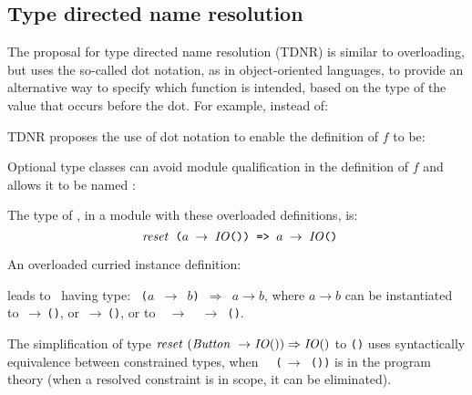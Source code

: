 \subsection{Type directed name resolution}
\label{sec:type-directed-name-resolution}

The proposal for type directed name resolution (TDNR)
\cite{TDNR-proposal} is similar to overloading, but uses the so-called
dot notation, as in object-oriented languages, to provide an
alternative way to specify which function is intended, based on the
type of the value that occurs before the dot. For example, instead of:


TDNR proposes the use of dot notation to enable the definition of $f$
to be: %


Optional type classes can avoid module qualification in the definition
of $f$ and allows it to be named \reset:
    

The type of \reset, in a module with these overloaded definitions, is:
\[ \texttt{ {\it reset\/}\ ($a$ $\rightarrow$ {\it IO\/}()) => $a$ $\rightarrow$ {\it IO\/}()} \]
  
An overloaded curried instance definition:

leads to \reset\ having type:
{\tt \reset\ ($a$ $\rightarrow$ $b$) $\Rightarrow$ $a \rightarrow b$}, where $a\rightarrow b$ can be
instantiated to {\tt \Button$\,\rightarrow\,$\IO()}, or {\tt \Canvas$\,\rightarrow\,$\IO()}, or
to {\tt $\,$\Button\ $\rightarrow$ \Canvas\ $\rightarrow$ \IO()}.
  
The simplification of type \mbox{$\reset\ (\Button\ \rightarrow \IO())
  \Rightarrow \IO()$} to {\tt \IO()} uses syntactically equivalence
between constrained types, when {\tt
  \reset\ (\Button$\,\rightarrow$\,\IO())} is in the program theory
(when a resolved constraint is in scope, it can be eliminated).

